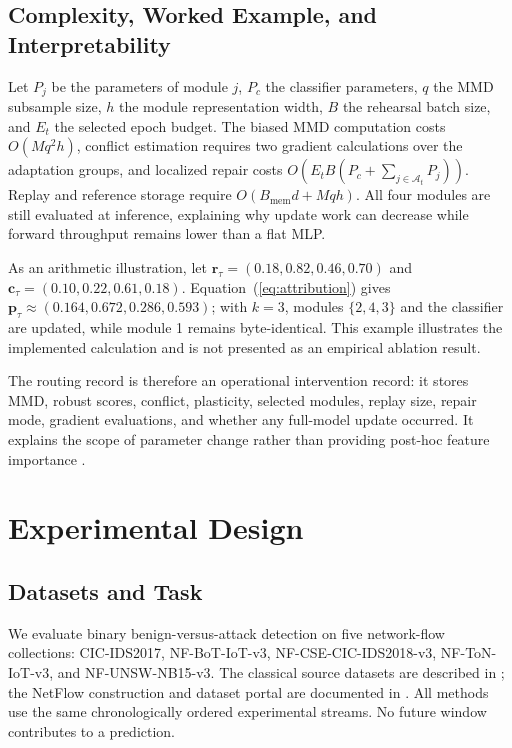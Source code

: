 \documentclass{ieeeaccess}
\begin{document}
\subsection{Complexity, Worked Example, and Interpretability}
Let $P_j$ be the parameters of module $j$, $P_c$ the classifier parameters, $q$ the MMD subsample size, $h$ the module representation width, $B$ the rehearsal batch size, and $E_t$ the selected epoch budget. The biased MMD computation costs $O(Mq^2h)$, conflict estimation requires two gradient calculations over the adaptation groups, and localized repair costs $O(E_tB(P_c+\sum_{j\in\mathcal A_t}P_j))$. Replay and reference storage require $O(B_{\mathrm{mem}}d+Mqh)$. All four modules are still evaluated at inference, explaining why update work can decrease while forward throughput remains lower than a flat MLP.

As an arithmetic illustration, let $\mathbf r_{\tau}=(0.18,0.82,0.46,0.70)$ and $\mathbf c_{\tau}=(0.10,0.22,0.61,0.18)$. Equation~(\ref{eq:attribution}) gives $\mathbf p_{\tau}\approx(0.164,0.672,0.286,0.593)$; with $k=3$, modules $\{2,4,3\}$ and the classifier are updated, while module 1 remains byte-identical. This example illustrates the implemented calculation and is not presented as an empirical ablation result.

The routing record is therefore an operational intervention record: it stores MMD, robust scores, conflict, plasticity, selected modules, replay size, repair mode, gradient evaluations, and whether any full-model update occurred. It explains the scope of parameter change rather than providing post-hoc feature importance \cite{Ribeiro2016LIME,Lundberg2017SHAP,Schwalbe2024XAITaxonomy}.

\section{Experimental Design}
\label{sec:experiments}

\subsection{Datasets and Task}
We evaluate binary benign-versus-attack detection on five network-flow collections: CIC-IDS2017, NF-BoT-IoT-v3, NF-CSE-CIC-IDS2018-v3, NF-ToN-IoT-v3, and NF-UNSW-NB15-v3. The classical source datasets are described in \cite{Ali2024NIDSSurvey,Sharafaldin2018CICIDS,Moustafa2015UNSW,Moustafa2019ToNIoT}; the NetFlow construction and dataset portal are documented in \cite{Layeghy2022NFv2,Luay2025NetFlowV3,UQNIDSDatasets2025}. All methods use the same chronologically ordered experimental streams. No future window contributes to a prediction.
\end{document}
